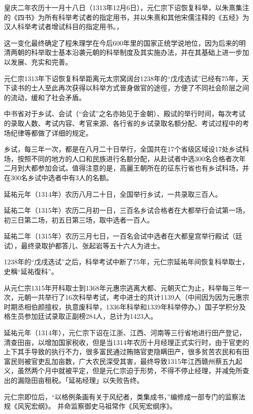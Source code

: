皇庆二年农历十一月十八日（1313年12月6日），元仁宗下诏恢复科举，以朱熹集注的《四书》为所有科举考试者的指定用书，并以朱熹和其他宋儒注释的《五经》为汉人科举考试者增试科目的指定用书。，

这一变化最终确定了程朱理学在今后600年里的国家正统学说地位，因为后来的明清两朝的科举取士基本沿袭元朝的科举制度及其实施办法，并在其基础上进一步加以发展、充实和完善。

元仁宗1313年下诏恢复科举距离元太宗窝阔台1238年的“戊戌选试”已经有75年，天下读书的士人至此再次获得以科举方式晉身做官的途徑，方便了不同社会阶层之间的流动，缓和了社会矛盾。

中书省对于乡试、会试（“会试”之名亦始见于金朝）、殿试的举行时间，每次考试的录取人数、考试内容、考官来源、各行省的乡试录取名额分配、考试过程中的考场纪律等都做了详细的规定。

乡试，每三年一次，都是在八月二十日举行，全国共在17个省级区域设17处乡试科场，按照不同的地方的人口和民族进行名额分配，从赴试者中选300名合格者次年二月到大都参加会试。值得注意的是，高麗王朝所在的征东行省也有乡试科场，并在300名乡试中选者中有3人的名额。

延祐元年（1314年）农历八月二十日，全国举行乡试，一共录取三百人。

延祐二年（1315年）农历二月初一日，三百名乡试合格者在大都举行会试第一场，初三日第二场，初五日第三场，取中选者一百人。

延祐二年（1315年）农历三月七日，一百名会试中选者在大都皇宫举行殿试（廷试），最终录取护都答儿、张起岩等五十六人为进士。

1238年的“戊戌选试”之后，科举考试中断了75年，元仁宗延祐年间恢复科举取士，史稱“延祐復科”。

从元仁宗1315年开科取士到1368年元惠宗逃离大都、元朝灭亡为止，科举每三年一次，元朝一共举行了16次科举考试，考中进士的共计1139人（中间因为因为元惠宗时期丞相伯颜擅权，执意废科举，1336年科举和1339年科举停办。）国子学积分及格生员参加廷试录取正副榜284人，总计为1423人。

延祐元年（1314年），元仁宗下诏在江浙、江西、河南等三行省地进行田产登记，清查田亩，以增加国家税收，但是当1314年农历十月经理正式实行时，由于官吏的上下其手导致的执行不力，很多富民通过贿赂官吏隐瞒田产，很多贫苦农民和有田富民则被官吏乱加亩数，广大农民深受其害，最终导致1315年江西赣州蔡五九起义，虽然两个月中就被平定，但是元仁宗迫于形势，不得不停止经理，并减免所查出的漏隐田亩租税。「延祐经理」以失败告终。

元仁宗即位后，“以格例条画有关于风纪者，类集成书，”编修成一部专门的监察法规《风宪宏纲》。 并命监察御史马祖常作《风宪宏纲序》。

